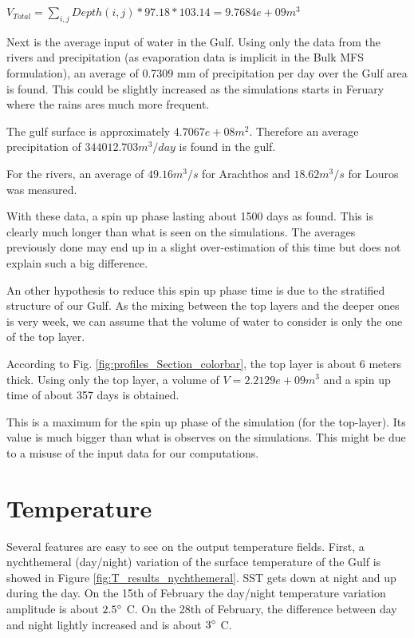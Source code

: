\documentclass[english]{PFeENSTA}
\begin{document}
{\begin{center}
$V_{Total}=  \sum_{i,j} Depth(i,j) * 97.18*103.14 =  9.7684e+09 m^3$

\end{center}

Next is the average input of water in the Gulf. Using only the data from the rivers and precipitation (as evaporation data is implicit in the Bulk MFS formulation), an average of 0.7309 mm of precipitation per day over the Gulf area is found. This could be slightly increased as the simulations starts in Feruary where the rains ares much more frequent. 
 
The gulf surface is approximately $4.7067e+08 m^2$. Therefore an average precipitation of $344012.703 m^3/day$ is found in the gulf. 

For the rivers, an average of $49.16 m^3/s$ for Arachthos and $18.62 m^3/s$ for Louros was measured.


With these data, a spin up phase lasting about 1500 days as found. This is clearly much longer than what is seen on the simulations. The averages previously done may end up in a slight over-estimation of this time but does not explain such a big difference. 

An other hypothesis to reduce this spin up phase time is due to the stratified structure of our Gulf. As the mixing between the top layers and the deeper ones is very week, we can assume that the volume of water to consider is only the one of the top layer. 

According to Fig. \ref{fig:profiles_Section_colorbar}, the top layer is about 6 meters thick. 
Using only the top layer, a volume of $V = 2.2129e+09 m^3 $ and a spin up time of about 357 days is obtained. 

This is a maximum for the spin up phase of the simulation (for the top-layer). Its value is much bigger than what is observes on the simulations. This might be due to a misuse of the input data for our computations.



\section{Temperature}

Several features are easy to see on the output temperature fields. First, a nychthemeral (day/night) variation of the surface temperature of the Gulf is showed in Figure \ref{fig:T_results_nychthemeral}. SST gets down at night and up during the day. On the 15th of February the day/night temperature variation amplitude is about $2.5 \degree$ C. On the 28th of February, the difference between day and night lightly increased and is about $3 \degree$ C.

}
\end{document}
